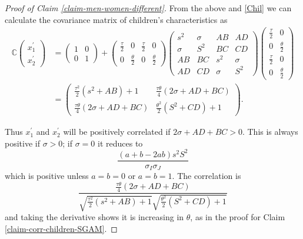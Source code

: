 \documentclass[
  12pt,
]{article}
\theoremstyle{definition}
\theoremstyle{definition}
\theoremstyle{definition}
\theoremstyle{definition}
\theoremstyle{remark}
\begin{document}
\begin{proof}[Proof of Claim \ref{claim-men-women-different}]
From the above and \eqref{Chil} we can calculate the
covariance matrix of children's characteristics as
\begin{align*}
\mathbb{C}\left(\begin{array}{c}
x_{1}^{\prime}\\
x_{2}^{\prime}
\end{array}\right) & =\left(\begin{array}{cc}
1 & 0\\
0 & 1
\end{array}\right)+\left(\begin{array}{cccc}
\frac{\tau}{2} & 0 & \frac{\tau}{2} & 0\\
0 & \frac{\theta}{2} & 0 & \frac{\theta}{2}
\end{array}\right)\left(\begin{array}{cccc}
s^{2} & \sigma & AB & AD\\
\sigma & S^{2} & BC & CD\\
AB & BC & s^{2} & \sigma\\
AD & CD & \sigma & S^{2}
\end{array}\right)\left(\begin{array}{cc}
\frac{\tau}{2} & 0\\
0 & \frac{\theta}{2}\\
\frac{\tau}{2} & 0\\
0 & \frac{\theta}{2}
\end{array}\right)\\
 & =\left(\begin{array}{cc}
\frac{\tau^{2}}{2}(s^{2}+AB)+1 & \frac{\tau\theta}{4}(2\sigma+AD+BC)\\
\frac{\tau\theta}{4}(2\sigma+AD+BC) & \frac{\theta^{2}}{2}(S^{2}+CD)+1
\end{array}\right).
\end{align*}

Thus $x_{1}^{\prime}$ and $x_{2}^{\prime}$ will be positively correlated
if $2\sigma+AD+BC>0$. This is always positive if $\sigma>0$; if $\sigma=0$ 
it reduces to
\[
\frac{(a+b-2ab)s^{2}S^{2}}{\sigma_{I}\sigma_{J}}
\]
which is positive unless $a=b=0$ or $a=b=1$. The correlation is
\[
\frac{
\frac{\tau\theta}{4}(2\sigma+AD+BC)
}{
\sqrt{\frac{\tau^{2}}{2}(s^{2}+AB)+1}
\sqrt{\frac{\theta^{2}}{2}(S^{2}+CD)+1}
}
\]
and taking the derivative shows it is increasing in $\theta$, as in the proof 
for Claim \ref{claim-corr-children-SGAM}.
\end{proof}
\end{document}
